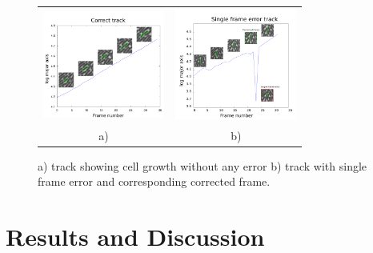 \documentclass[journal]{IEEEtran}
\begin{document}
\begin{figure}[h]
	\begin{center}
		\begin{tabular}{cc}
			\includegraphics[width=4cm]{correcttrack.png}&\includegraphics[width=4cm]{singleerrtrack.png}
			\\
			a) & b)
		\end{tabular}
		\caption{a) track showing cell growth without any error b) track with single frame error and corresponding corrected frame.}\label{fig:track}
	\end{center}
\end{figure}


\section{Results and Discussion}
\end{document}
